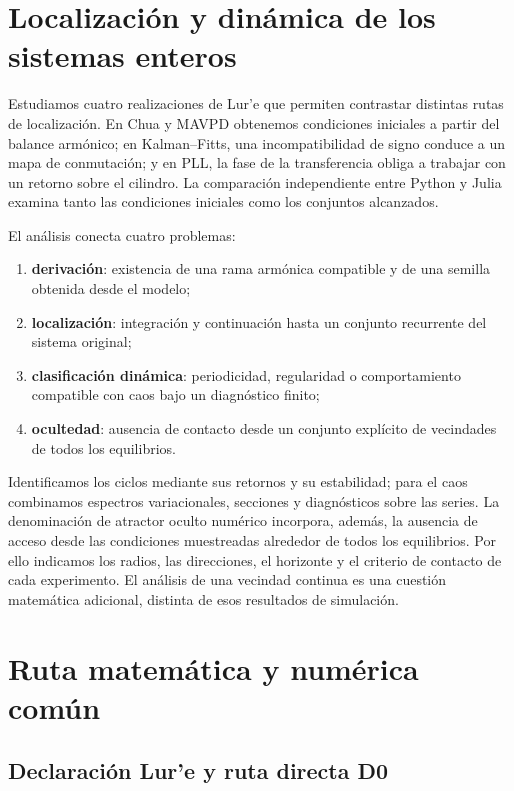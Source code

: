 \section{Localización y dinámica de los sistemas enteros}

Estudiamos cuatro realizaciones de Lur'e que permiten contrastar distintas
rutas de localización. En Chua y MAVPD obtenemos condiciones iniciales a
partir del balance armónico; en Kalman--Fitts, una incompatibilidad de signo
conduce a un mapa de conmutación; y en PLL, la fase de la transferencia obliga
a trabajar con un retorno sobre el cilindro. La comparación independiente
entre Python y Julia examina tanto las condiciones iniciales como los
conjuntos alcanzados.

El análisis conecta cuatro problemas:

\begin{enumerate}
  \item \textbf{derivación}: existencia de una rama armónica compatible y de
        una semilla obtenida desde el modelo;
  \item \textbf{localización}: integración y continuación hasta un conjunto
        recurrente del sistema original;
  \item \textbf{clasificación dinámica}: periodicidad, regularidad o
        comportamiento compatible con caos bajo un diagnóstico finito;
  \item \textbf{ocultedad}: ausencia de contacto desde un conjunto explícito
        de vecindades de todos los equilibrios.
\end{enumerate}

Identificamos los ciclos mediante sus retornos y su estabilidad; para el caos
combinamos espectros variacionales, secciones y diagnósticos sobre las series.
La denominación de atractor oculto numérico incorpora, además, la ausencia de
acceso desde las condiciones muestreadas alrededor de todos los equilibrios.
Por ello indicamos los radios, las direcciones, el horizonte y el criterio de
contacto de cada experimento. El análisis de una vecindad continua es una
cuestión matemática adicional, distinta de esos resultados de simulación.

\section{Ruta matemática y numérica común}

\subsection{Declaración Lur'e y ruta directa D0}

